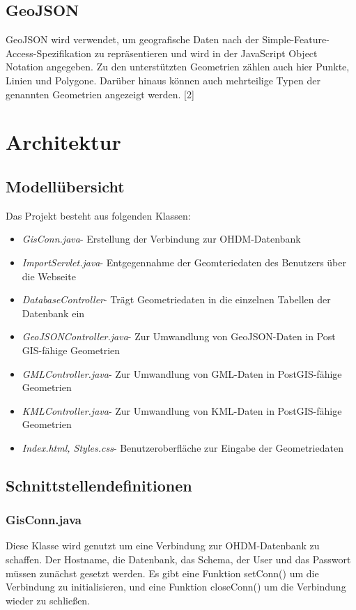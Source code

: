 \documentclass[]{article}
\begin{document}
\subsection{GeoJSON}
GeoJSON wird verwendet, um geografische Daten nach der Simple-Feature-Access-Spezifikation zu repräsentieren und wird in der JavaScript Object Notation angegeben. Zu den unterstützten Geometrien zählen auch hier Punkte, Linien und Polygone. Darüber hinaus können auch mehrteilige Typen der genannten Geometrien angezeigt werden. [2]

\section{Architektur}
\subsection{Modellübersicht}
Das Projekt besteht aus folgenden Klassen:
\begin{itemize}
	\item \textit{GisConn.java}- Erstellung der Verbindung zur OHDM-Datenbank
	\item \textit{ImportServlet.java}- Entgegennahme der Geomteriedaten des Benutzers über die Webseite
	\item \textit{DatabaseController}- Trägt Geometriedaten in die einzelnen Tabellen der Datenbank ein
	\item \textit{GeoJSONController.java}- Zur Umwandlung von GeoJSON-Daten in Post\\GIS-fähige Geometrien
	\item \textit{GMLController.java}- Zur Umwandlung von GML-Daten in PostGIS-fähige Geometrien
	\item \textit{KMLController.java}- Zur Umwandlung von KML-Daten in PostGIS-fähige Geometrien
	\item \textit{Index.html, Styles.css}- Benutzeroberfläche zur Eingabe der Geometriedaten
\end{itemize}

\subsection{Schnittstellendefinitionen}
\subsubsection{GisConn.java}
Diese Klasse wird genutzt um eine Verbindung zur OHDM-Datenbank zu schaffen. Der Hostname, die Datenbank, das Schema, der User und das Passwort müssen zunächst gesetzt werden. Es gibt eine Funktion setConn() um die Verbindung zu initialisieren, und eine Funktion closeConn() um die Verbindung wieder zu schließen. 
\end{document}
